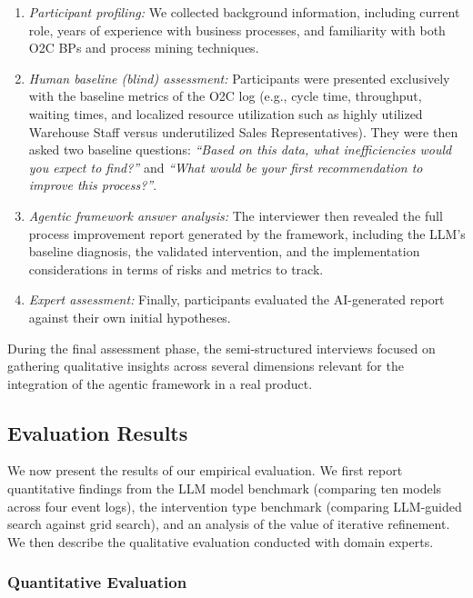 \documentclass[preprint,12pt]{elsarticle}
\begin{document}
\begin{enumerate}
    \item \textit{Participant profiling:} We collected background information, including current role, years of experience with business processes, and familiarity with both O2C BPs and process mining techniques.
    
    \item \textit{Human baseline (blind) assessment:} Participants were presented exclusively with the baseline metrics of the O2C log (e.g., cycle time, throughput, waiting times, and localized resource utilization such as highly utilized Warehouse Staff versus underutilized Sales Representatives). They were then asked two baseline questions: \textit{``Based on this data, what inefficiencies would you expect to find?''} and \textit{``What would be your first recommendation to improve this process?''}.
    
    \item \textit{Agentic framework answer analysis:} The interviewer then revealed the full process improvement report generated by the framework, including the LLM's baseline diagnosis, the validated intervention, and the implementation considerations in terms of risks and metrics to track.
    
    \item \textit{Expert assessment:} Finally, participants evaluated the AI-generated report against their own initial hypotheses.
\end{enumerate}

During the final assessment phase, the semi-structured interviews focused on gathering qualitative insights across several dimensions relevant for the integration of the agentic framework in a real product.

\subsection{Evaluation Results}

We now present the results of our empirical evaluation. We first report quantitative findings from the LLM model benchmark (comparing ten models across four event logs), the intervention type benchmark (comparing LLM-guided search against grid search), and an analysis of the value of iterative refinement. We then describe the qualitative evaluation conducted with domain experts.

\subsubsection{Quantitative Evaluation}
\label{sec:quantitative_res}
\end{document}
